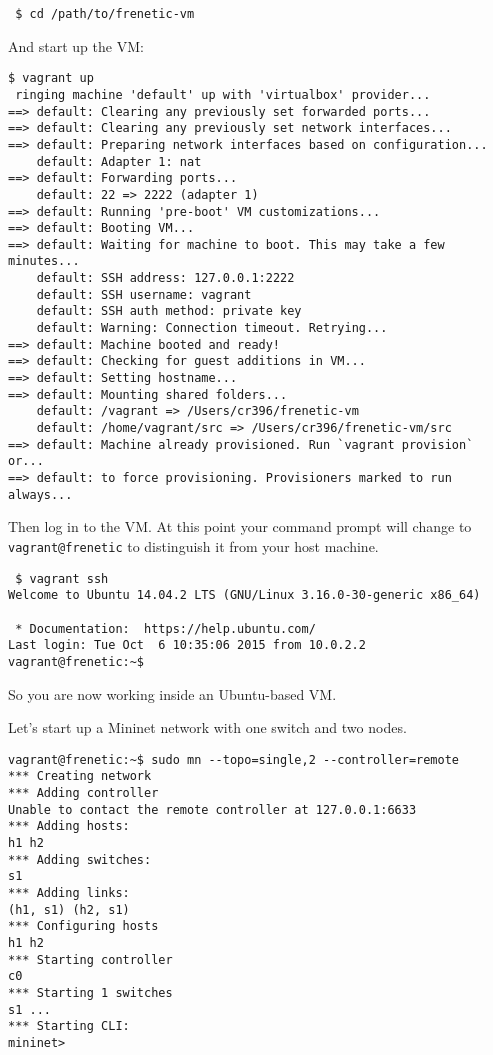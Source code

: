 \begin{verbatim}
 $ cd /path/to/frenetic-vm
\end{verbatim}
 
And start up the VM:

\begin{verbatim}
$ vagrant up
 ringing machine 'default' up with 'virtualbox' provider...
==> default: Clearing any previously set forwarded ports...
==> default: Clearing any previously set network interfaces...
==> default: Preparing network interfaces based on configuration...
    default: Adapter 1: nat
==> default: Forwarding ports...
    default: 22 => 2222 (adapter 1)
==> default: Running 'pre-boot' VM customizations...
==> default: Booting VM...
==> default: Waiting for machine to boot. This may take a few minutes...
    default: SSH address: 127.0.0.1:2222
    default: SSH username: vagrant
    default: SSH auth method: private key
    default: Warning: Connection timeout. Retrying...
==> default: Machine booted and ready!
==> default: Checking for guest additions in VM...
==> default: Setting hostname...
==> default: Mounting shared folders...
    default: /vagrant => /Users/cr396/frenetic-vm
    default: /home/vagrant/src => /Users/cr396/frenetic-vm/src
==> default: Machine already provisioned. Run `vagrant provision` or...
==> default: to force provisioning. Provisioners marked to run always...
\end{verbatim}

Then log in to the VM.  At this point your command prompt will change to {\tt vagrant@frenetic} to distinguish it
from your host machine.

\begin{verbatim}
 $ vagrant ssh
Welcome to Ubuntu 14.04.2 LTS (GNU/Linux 3.16.0-30-generic x86_64)

 * Documentation:  https://help.ubuntu.com/
Last login: Tue Oct  6 10:35:06 2015 from 10.0.2.2
vagrant@frenetic:~$ 
\end{verbatim}

So you are now working inside an Ubuntu-based VM.  

Let's start up a Mininet network with one switch and two nodes.

\begin{verbatim}
vagrant@frenetic:~$ sudo mn --topo=single,2 --controller=remote
*** Creating network
*** Adding controller
Unable to contact the remote controller at 127.0.0.1:6633
*** Adding hosts:
h1 h2
*** Adding switches:
s1
*** Adding links:
(h1, s1) (h2, s1)
*** Configuring hosts
h1 h2
*** Starting controller
c0
*** Starting 1 switches
s1 ...
*** Starting CLI:
mininet>
\end{verbatim}

